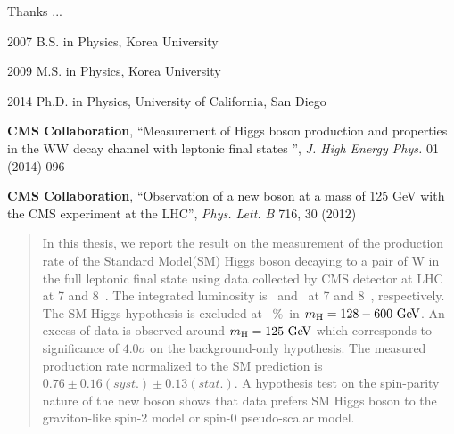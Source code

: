 \begin{frontmatter}
%
\tableofcontents
\listoffigures  %
\listoftables   %



%
%
\begin{acknowledgements} 
 Thanks ... 

\end{acknowledgements}


%
%
\begin{vitapage}
\begin{vita}
  \item[2007] B.S. in Physics, Korea University 
  \item[2009] M.S. in Physics, Korea University 
  \item[2014] Ph.D. in Physics, University of California, San Diego 
\end{vita}
\begin{publications}
  \item \textbf{CMS Collaboration}, {``Measurement of Higgs boson production and properties in the WW decay channel with leptonic final states ''}, \emph{J. High Energy Phys.} 01 (2014) 096
  \item \textbf{CMS Collaboration}, {``Observation of a new boson at a mass of 125 GeV with the CMS experiment at the LHC''}, \emph{Phys. Lett. B} 716, 30 (2012) 
\end{publications}
\end{vitapage}


%
%
\begin{abstract}
  In this thesis, we report the result on the measurement of the production rate 
  of the Standard Model(SM) Higgs boson decaying to a pair of W in the full leptonic final state
  using data collected by CMS detector at LHC at 7 and 8~\TeV. The integrated luminosity 
  is \intlumiSevenTeV\ and \intlumiEightTeV\ at 7 and 8~\TeV, respectively. 
  The SM Higgs hypothesis is excluded at ~\%\ in $m_{\mathrm{H}}=128-600~\mathrm{Ge\kern -0.1em V}$.   
  An excess of data is observed around $m_{\mathrm{H}}=125~\mathrm{Ge\kern -0.1em V}$ which corresponds to significance 
  of $4.0\sigma$ on the background-only hypothesis. The measured production rate normalized 
  to the SM prediction is $0.76 \pm 0.16(syst.) \pm 0.13(stat.)$. 
  A hypothesis test on the spin-parity nature of the new boson shows that data prefers 
  SM Higgs boson to the graviton-like spin-2 model or spin-0 pseudo-scalar model. 

\end{abstract}


\end{frontmatter}
